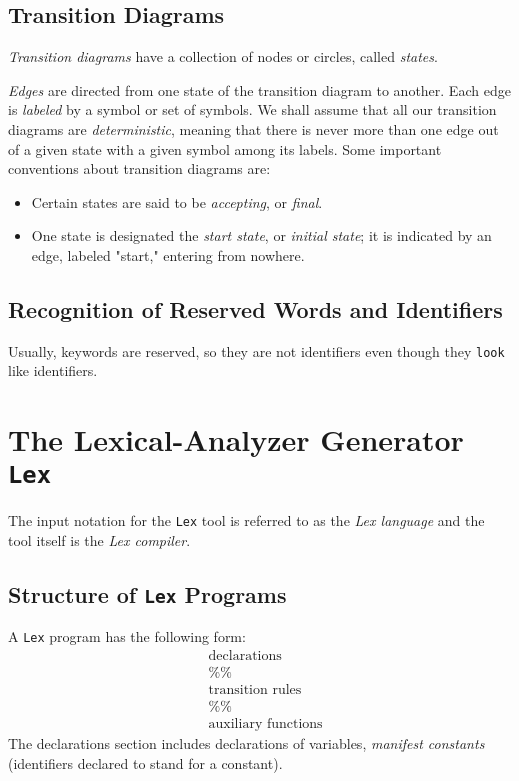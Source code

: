 \documentclass[a4paper,twoside]{book}
\begin{document}
\subsection{Transition Diagrams}

\textit{Transition diagrams} have a collection of nodes or circles, called \textit{states}.

\textit{Edges} are directed from one state of the transition diagram to another. Each edge is \textit{labeled} by a symbol or set of symbols. We shall assume that all our transition diagrams are \textit{deterministic}, meaning that there is never more than one edge out of a given state with a given symbol among its labels. Some important conventions about transition diagrams are:
\begin{itemize}
    \item Certain states are said to be \textit{accepting}, or \textit{final}.
    \item One state is designated the \textit{start state}, or \textit{initial state}; it is indicated by an edge, labeled "start," entering from nowhere.
\end{itemize}

\subsection{Recognition of Reserved Words and Identifiers}

Usually, keywords are reserved, so they are not identifiers even though they \verb|look| like identifiers.

\section{The Lexical-Analyzer Generator \texttt{Lex}}

The input notation for the \verb|Lex| tool is referred to as the \textit{Lex language} and the tool itself is the \textit{Lex compiler}.

\subsection{Structure of \texttt{Lex} Programs}

A \verb|Lex| program has the following form:
\begin{equation*}
    \begin{aligned}&\text{declarations}\\&\%\%\\&\text{transition rules}\\&\%\%\\&\text{auxiliary functions}\end{aligned}
\end{equation*}
The declarations section includes declarations of variables, \textit{manifest constants} (identifiers declared to stand for a constant).
\end{document}
